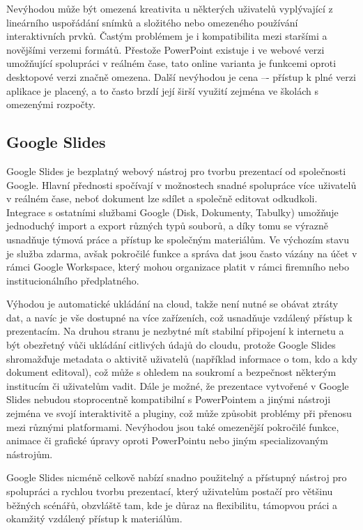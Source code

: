 Nevýhodou může být omezená kreativita u některých uživatelů vyplývající z lineárního uspořádání snímků a složitého nebo omezeného používání interaktivních prvků. 
Častým problémem je i kompatibilita mezi staršími a novějšími verzemi formátů.
Přestože PowerPoint existuje i ve webové verzi umožňující spolupráci v reálném čase, tato online varianta je funkcemi oproti desktopové verzi značně omezena.
Další nevýhodou je cena –- přístup k plné verzi aplikace je placený, a to často brzdí její širší využití zejména ve školách s omezenými rozpočty.

\subsection{Google Slides}

Google Slides je bezplatný webový nástroj pro tvorbu prezentací od společnosti Google. 
Hlavní přednosti spočívají v možnostech snadné spolupráce více uživatelů v reálném čase, neboť dokument lze sdílet a společně editovat odkudkoli.
Integrace s ostatními službami Google (Disk, Dokumenty, Tabulky) umožňuje jednoduchý import a export různých typů souborů, a díky tomu se výrazně usnadňuje týmová práce a přístup ke společným materiálům. 
Ve výchozím stavu je služba zdarma, avšak pokročilé funkce a správa dat jsou často vázány na účet v rámci Google Workspace, který mohou organizace platit v rámci firemního nebo institucionálního předplatného. 

Výhodou je automatické ukládání na cloud, takže není nutné se obávat ztráty dat, a navíc je vše dostupné na více zařízeních, což usnadňuje vzdálený přístup k prezentacím. 
Na druhou stranu je nezbytné mít stabilní připojení k internetu a být obezřetný vůči ukládání citlivých údajů do cloudu, protože Google Slides shromažďuje metadata o aktivitě uživatelů (například informace o tom, kdo a kdy dokument editoval), což může s ohledem na soukromí a bezpečnost některým institucím či uživatelům vadit. 
Dále je možné, že prezentace vytvořené v Google Slides nebudou stoprocentně kompatibilní s PowerPointem a jinými nástroji zejména ve svojí interaktivitě a pluginy, což může způsobit problémy při přenosu mezi různými platformami. 
Nevýhodou jsou také omezenější pokročilé funkce, animace či grafické úpravy oproti PowerPointu nebo jiným specializovaným nástrojům. 

Google Slides nicméně celkově nabízí snadno použitelný a přístupný nástroj pro spolupráci a rychlou tvorbu prezentací, který uživatelům postačí pro většinu běžných scénářů, obzvláště tam, kde je důraz na flexibilitu, támopvou práci a okamžitý vzdálený přístup k materiálům.


